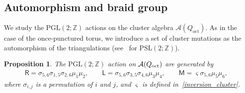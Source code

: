 \documentclass[pdftex]{sigma}
\numberwithin{equation}{section}
\newtheorem{Proposition}[Theorem]{Proposition}
 { \theoremstyle{definition}
\newtheorem{Definition}[Theorem]{Definition}
\newtheorem{Note}[Theorem]{Note}
\newtheorem{Example}[Theorem]{Example}
\newtheorem{Remark}[Theorem]{Remark} }
\begin{document}
\subsection{Automorphism and braid group}
We study the $\mathrm{PGL}(2;\mathbb{Z})$ actions on the cluster algebra $\mathcal{A}(Q_{\text{oct}})$. As in the case of the once-punctured torus, we introduce a set of cluster mutations as the automorphism of the triangulations (see~\cite{HikamiRInoue12a} for $\mathrm{PSL}(2;\mathbb{Z})$).

\begin{Proposition} The $\mathrm{PGL}(2;\mathbb{Z})$ action on $\mathcal{A}(Q_{\text{\rm oct}})$ are generated by
 \begin{gather} \label{RL_mutation}
\mathsf{R} = \sigma_{5,6} \sigma_{1,5} \sigma_{2,6} \mu_1 \mu_2 ,\qquad \mathsf{L} = \sigma_{5,6} \sigma_{3,5} \sigma_{4,6} \mu_3 \mu_4 ,\qquad \mathsf{M}= \varsigma \sigma_{5,6} \mu_5 \mu_6 ,
\end{gather}
where $\sigma_{i,j}$ is a permutation of $i$ and $j$, and $\varsigma$ is defined in~\eqref{inversion_cluster}.
\end{Proposition}
\end{document}
